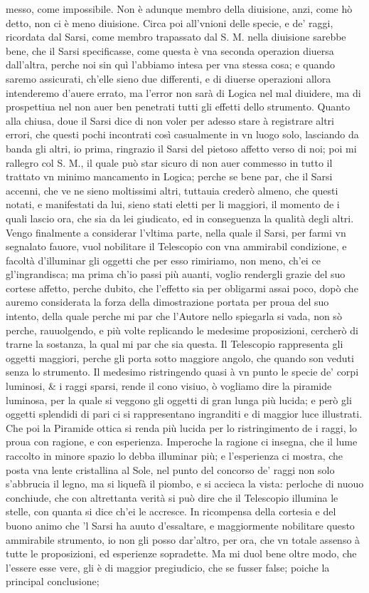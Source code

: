 \documentclass[11pt,twoside,openany]{book}
\begin{document}
messo, come impossibile. Non è adunque membro della diuisione, anzi, come hò detto, non ci è meno diuisione. Circa poi all'vnioni delle specie, e de' raggi, ricordata dal Sarsi, come membro trapassato dal S. M. nella diuisione sarebbe bene, che il Sarsi specificasse, come questa è vna seconda operazion diuersa dall'altra, perche noi sin quì l'abbiamo intesa per vna stessa cosa; e quando saremo assicurati, ch'elle sieno due differenti, e di diuerse operazioni allora intenderemo d'auere errato, ma l'error non sarà di Logica nel mal diuidere, ma di prospettiua nel non auer ben penetrati tutti gli effetti dello strumento. Quanto alla chiusa, doue il Sarsi dice di non voler per adesso stare à registrare altri errori, che questi pochi incontrati così casualmente in vn luogo solo, lasciando da banda gli altri, io prima, ringrazio il Sarsi del pietoso affetto verso di noi; poi mi rallegro col S. M., il quale può star sicuro di non auer commesso in tutto il trattato vn minimo mancamento in Logica; perche se bene par, che il Sarsi accenni, che ve ne sieno moltissimi altri, tuttauia crederò almeno, che questi notati, e manifestati da lui, sieno stati eletti per li maggiori, il momento de i quali lascio ora, che sia da lei giudicato, ed in conseguenza la qualità degli altri. Vengo finalmente a considerar l'vltima parte, nella quale il Sarsi, per farmi vn segnalato fauore, vuol nobilitare il Telescopio con vna ammirabil condizione, e facoltà d'illuminar gli oggetti che per esso rimiriamo, non meno, ch'ei ce gl'ingrandisca; ma prima ch'io passi più auanti, voglio rendergli grazie del suo cortese affetto, perche dubito, che l'effetto sia per obligarmi assai poco, dopò che auremo considerata la forza della dimostrazione portata per proua del suo intento, della quale perche mi par che l'Autore nello spiegarla si vada, non sò perche, rauuolgendo, e più volte replicando le medesime proposizioni, cercherò di trarne la sostanza, la qual mi par che sia questa. Il Telescopio rappresenta gli oggetti maggiori, perche gli porta sotto maggiore angolo, che quando son veduti senza lo strumento. Il medesimo ristringendo quasi à vn punto le specie de' corpi luminosi, \& i raggi sparsi, rende il cono visiuo, ò vogliamo dire la piramide luminosa, per la quale si veggono gli oggetti di gran lunga più lucida; e però gli oggetti splendidi di pari ci si rappresentano ingranditi e di maggior luce illustrati. Che poi la Piramide ottica si renda più lucida per lo ristringimento de i raggi, lo proua con ragione, e con esperienza. Imperoche la ragione ci insegna, che il lume raccolto in minore spazio lo debba illuminar più; e l'esperienza ci mostra, che posta vna lente cristallina al Sole, nel punto del concorso de' raggi non solo s'abbrucia il legno, ma si liquefà il piombo, e si accieca la vista: perloche di nuouo conchiude, che con altrettanta verità si può dire che il Telescopio illumina le stelle, con quanta si dice ch'ei le accresce. In ricompensa della cortesia e del buono animo che 'l Sarsi ha auuto d'essaltare, e maggiormente nobilitare questo ammirabile strumento, io non gli posso dar'altro, per ora, che vn totale assenso à tutte le proposizioni, ed esperienze sopradette. Ma mi duol bene oltre modo, che l'essere esse vere, gli è di maggior pregiudicio, che se fusser false; poiche la principal conclusione; 
\end{document}
